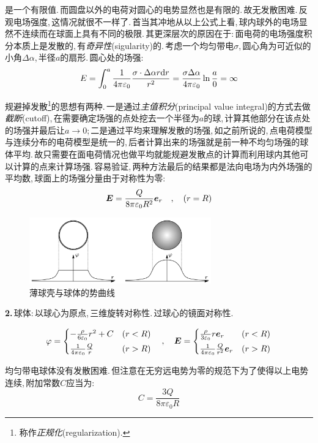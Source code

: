 是一个有限值.\,而圆盘以外的电荷对圆心的电势显然也是有限的.\,故无发散困难.\,反观电场强度,\,这情况就很不一样了.\,首当其冲地从以上公式上看,\,球内球外的电场显然不连续而在球面上具有不同的极限.\,其更深层次的原因在于:\,面电荷的电场强度积分本质上是发散的,\,有\emph{奇异性}(sigularity)的.\,考虑一个均匀带电$\sigma$,\,圆心角为可近似的小角$\Delta\alpha$,\,半径$a$的扇形.\,圆心处的场强:
\[E=\int_0^a \frac{1}{4\pi\varepsilon_0} \frac{\sigma \cdot \Delta \alpha r \textrm{d} r}{r^2}=\frac{\sigma\Delta\alpha}{4\pi\varepsilon_0}\ln\frac{a}{0}=\infty\]

规避掉发散\footnote{称作\emph{正规化}(regularization).}的思想有两种.\,一是通过\emph{主值积分}(principal value integral)的方式去做\emph{截断}(cutoff),\,在需要确定场强的点处挖去一个半径为$a$的球,\,计算其他部分在该点处的场强并最后让$a\to 0$;\,二是通过平均来理解发散的场强,\,如之前所说的,\,点电荷模型与连续分布的电荷模型是统一的,\,后者计算出来的场强就是前一种不均匀场强的球体平均.\,故只需要在面电荷情况也做平均就能规避发散点的计算而利用球内其他可以计算的点来计算场强.\,容易验证,\,两种方法最后的结果都是法向电场为内外场强的平均数,\,球面上的场强分量由于对称性为零:
\[\boldsymbol{E}=\frac{Q}{8\pi\varepsilon_0 R^2}\boldsymbol{e}_r\quad ,\quad (r=R)\]

\begin{figure}[H]
\centering
\includegraphics[width=0.7\textwidth]{image/7-1-18.png}
\caption{薄球壳与球体的势曲线}\label{fig7-1-18}
\end{figure}

\textbf{2.}\,球体:\,以球心为原点,\,三维旋转对称性.\,过球心的镜面对称性.

\[\varphi=\begin{cases} -\frac{\rho }{6\varepsilon_0}r^2+C& (r<R) \\[3pt] \frac{1}{4\pi\varepsilon_0} \frac{Q}{r} & (r>R) \end{cases} \quad,	\quad \boldsymbol{E}=\begin{cases}  \frac{\rho }{3\varepsilon_0}r \boldsymbol{e}_r & (r<R) \\[3pt] \frac{1}{4\pi\varepsilon_0} \frac{Q}{r^2}\boldsymbol{e}_r & (r>R) \end{cases}\]

均匀带电球体没有发散困难.\,但注意在无穷远电势为零的规范下为了使得以上电势连续,\,附加常数$C$应当为:
\[C=\frac{3Q}{8\pi\varepsilon_0 R}\]

